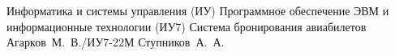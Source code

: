 \makecourseworktitle
{Информатика и системы управления (ИУ)}
{Программное обеспечение ЭВМ и информационные технологии (ИУ7)}
{Система бронирования авиабилетов}
{Агарков~М.~В./ИУ7-22М}
{Ступников~А.~А.}
{}
{}